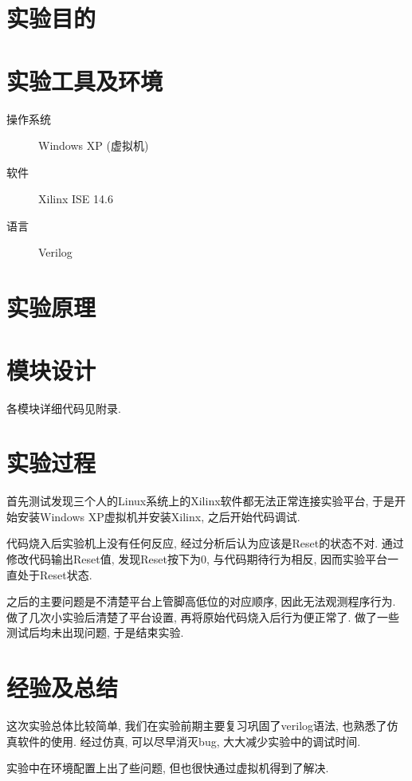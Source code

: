 
\section{实验目的}

\section{实验工具及环境}
\begin{description}
  \item[操作系统] Windows XP (虚拟机)
  \item[软件] Xilinx ISE 14.6
  \item[语言] Verilog
\end{description}

\section{实验原理}

\section{模块设计}

各模块详细代码见附录.

\section{实验过程}
首先测试发现三个人的Linux系统上的Xilinx软件都无法正常连接实验平台,
于是开始安装Windows XP虚拟机并安装Xilinx, 之后开始代码调试.

代码烧入后实验机上没有任何反应, 经过分析后认为应该是Reset的状态不对.
通过修改代码输出Reset值, 发现Reset按下为0, 与代码期待行为相反, 因而实验平台一直处于Reset状态.

之后的主要问题是不清楚平台上管脚高低位的对应顺序, 因此无法观测程序行为.
做了几次小实验后清楚了平台设置, 再将原始代码烧入后行为便正常了.
做了一些测试后均未出现问题, 于是结束实验.

\section{经验及总结}
这次实验总体比较简单, 我们在实验前期主要复习巩固了verilog语法,
也熟悉了仿真软件的使用.
经过仿真, 可以尽早消灭bug, 大大减少实验中的调试时间.

实验中在环境配置上出了些问题, 但也很快通过虚拟机得到了解决.

